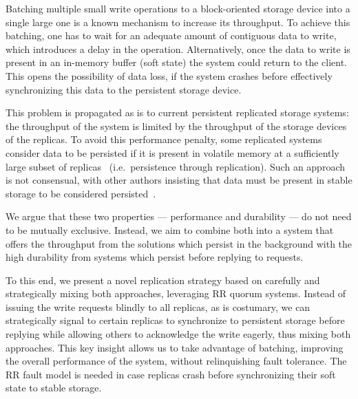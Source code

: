 
Batching multiple small write operations to a block-oriented storage device into a
single large one is a known mechanism to increase its throughput.
To achieve this batching, one has to wait for an adequate amount
of contiguous data to write, which introduces a delay in the
operation. Alternatively, once the data to write is present in
an in-memory buffer (soft state) the system could return to the
client. This opens the possibility of data loss, if the system
crashes before effectively synchronizing this data to the persistent
storage device.

%
This problem is propagated as is to current persistent replicated storage
systems: the throughput of the system is limited by the
throughput of the storage devices of the replicas. To avoid this
performance penalty, some replicated systems consider data to be persisted if it is
present in volatile memory at a sufficiently large subset of replicas~\cite{pbft}
(i.e.\ persistence through replication). Such an approach is not
consensual, with other authors insisting that data must be
present in stable storage to be considered
persisted~\cite{bolosky:paxos}.

We argue that these two properties --- performance and
durability --- do not need to be mutually exclusive. Instead, we
aim to combine both into a system that offers the throughput from
the solutions which persist in the background with the high
durability from systems which persist before replying to
requests.

To this end, we present a novel replication strategy based on
carefully and strategically mixing both approaches, leveraging
\ac{RR} quorum systems. Instead of issuing the write
requests blindly to all replicas, as is costumary, we can
strategically signal to certain replicas to synchronize to
persistent storage before replying while allowing others to
acknowledge the write eagerly, thus mixing both approaches. This
key insight allows us to take advantage of batching, improving the overall
performance of the system, without relinquishing fault tolerance.
The \ac{RR} fault model is needed in case replicas crash before
synchronizing their soft state to stable storage.

